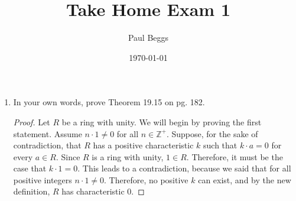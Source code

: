 \documentclass[12pt]{article}
\title{Take Home Exam 1}
\date{\today}
\author{Paul Beggs}
\newcommand{\Z}{\mathbb{Z}}
\newcommand{\pf}[1]{
    \begin{customframedproof}[linecolor=orangehdx!75]
        \begin{proof}
        #1
        \end{proof}
    \end{customframedproof}
}
\begin{document}

\begin{enumerate}
	\item In your own words, prove Theorem 19.15 on pg. 182.
	\pf{
		Let \(R\) be a ring with unity. We will begin by proving the first statement. Assume \(n \cdot 1 \ne 0\) for all \(n \in \Z^{+}\). Suppose, for the sake of contradiction, that \(R\) has a positive characteristic \(k\) such that \(k \cdot a = 0\) for every \(a \in R\). Since \(R\) is a ring with unity, \(1 \in R\). Therefore, it must be the case that \(k \cdot 1 = 0\). This leads to a contradiction, because we said that for all positive integers \(n \cdot 1 \ne 0\). Therefore, no positive \(k\) can exist, and by the new definition, \(R\) has characteristic 0. 

}
\end{enumerate}
\end{document}
